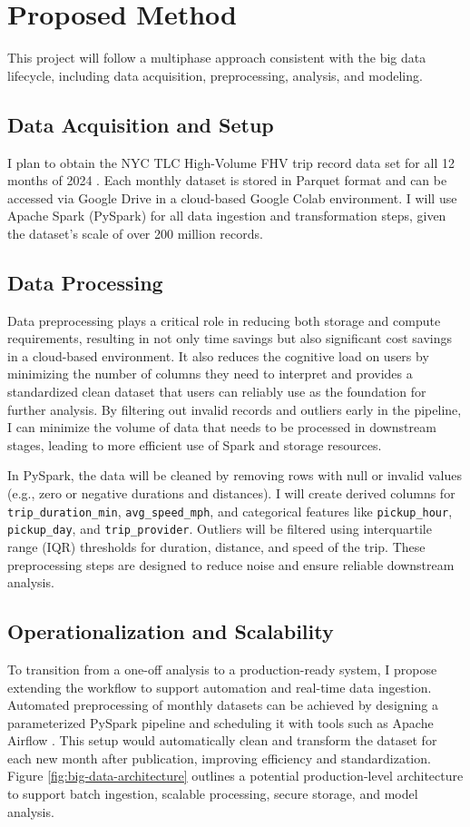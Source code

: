 \documentclass[12pt,letterpaper]{article}
\begin{document}
\section{Proposed Method}
This project will follow a multiphase approach consistent with the big data lifecycle, including data acquisition, preprocessing, analysis, and modeling.

\subsection{Data Acquisition and Setup}
I plan to obtain the NYC TLC High-Volume FHV trip record data set for all 12 months of 2024 \cite{dataset}. Each monthly dataset is stored in Parquet format and can be accessed via Google Drive in a cloud-based Google Colab environment. I will use Apache Spark (PySpark) for all data ingestion and transformation steps, given the dataset's scale of over 200 million records.

\subsection{Data Processing}
Data preprocessing plays a critical role in reducing both storage and compute requirements, resulting in not only time savings but also significant cost savings in a cloud-based environment. It also reduces the cognitive load on users by minimizing the number of columns they need to interpret and provides a standardized clean dataset that users can reliably use as the foundation for further analysis. By filtering out invalid records and outliers early in the pipeline, I can minimize the volume of data that needs to be processed in downstream stages, leading to more efficient use of Spark and storage resources.

In PySpark, the data will be cleaned by removing rows with null or invalid values (e.g., zero or negative durations and distances). I will create derived columns for \texttt{trip\_duration\_min}, \texttt{avg\_speed\_mph}, and categorical features like \texttt{pickup\_hour}, \texttt{pickup\_day}, and \texttt{trip\_provider}. Outliers will be filtered using interquartile range (IQR) thresholds for duration, distance, and speed of the trip. These preprocessing steps are designed to reduce noise and ensure reliable downstream analysis. 

\subsection{Operationalization and Scalability}
To transition from a one-off analysis to a production-ready system, I propose extending the workflow to support automation and real-time data ingestion. Automated preprocessing of monthly datasets can be achieved by designing a parameterized PySpark pipeline and scheduling it with tools such as Apache Airflow \cite{airflow2024}. This setup would automatically clean and transform the dataset for each new month after publication, improving efficiency and standardization. Figure \ref{fig:big-data-architecture} outlines a potential production-level architecture to support batch ingestion, scalable processing, secure storage, and model analysis.
\end{document}
